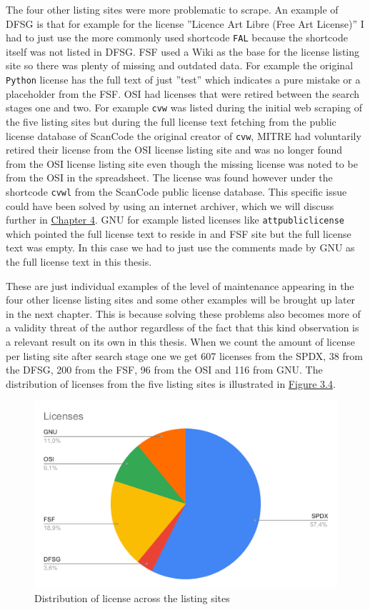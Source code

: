 The four other listing sites were more problematic to scrape. An example of DFSG is that for example for the license ''Licence Art Libre (Free Art License)'' I had to just use the more commonly used shortcode \texttt{FAL} because the shortcode itself was not listed in DFSG. FSF used a Wiki as the base for the license listing site so there was plenty of missing and outdated data. For example the original \texttt{Python} license has the full text of just ''test'' which indicates a pure mistake or a placeholder from the FSF. OSI had licenses that were retired between the search stages one and two. For example \texttt{cvw} was listed during the initial web scraping of the five listing sites but during the full license text fetching from the public license database of ScanCode the original creator of \texttt{cvw}, MITRE had voluntarily retired their license from the OSI license listing site and was no longer found from the OSI license listing site even though the missing license was noted to be from the OSI in the spreadsheet. The license was found however under the shortcode \texttt{cvwl} from the ScanCode public license database. This specific issue could have been solved by using an internet archiver, which we will discuss further in \hyperref[discussion]{Chapter 4}. GNU for example listed licenses like \texttt{attpubliclicense} which pointed the full license text to reside in and FSF site but the full license text was empty. In this case we had to just use the comments made by GNU as the full license text in this thesis.

These are just individual examples of the level of maintenance appearing in the four other license listing sites and some other examples will be brought up later in the next chapter. This is because solving these problems also becomes more of a validity threat of the author regardless of the fact that this kind observation is a relevant result on its own in this thesis. When we count the amount of license per listing site after search stage one we get 607 licenses from the SPDX, 38 from the DFSG, 200 from the FSF, 96 from the OSI and 116 from GNU. The distribution of licenses from the five listing sites is illustrated in \hyperref[fig:3-3]{Figure 3.4}.
\begin{figure}
	\centering
	\includegraphics[scale=0.76]{figures/figure-3-4.pdf}
	\caption{Distribution of license across the listing sites}
	\label{fig:3-4}
\end{figure}
